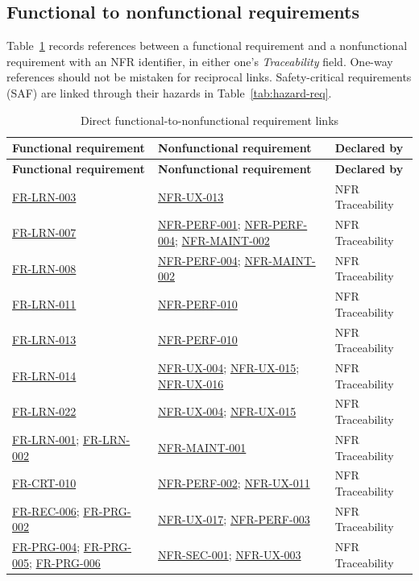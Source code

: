 \documentclass[12pt]{article}
\renewcommand{\_}{\textunderscore\allowbreak}%
\newcommand{\reqref}[1]{\hyperref[req:#1]{#1}}
\begin{document}
\subsection{Functional to nonfunctional requirements}
\label{sec:fr-nfr}

Table~\ref{tab:fr-nfr} records references between a functional requirement and
a nonfunctional requirement with an NFR identifier, in either one's
\emph{Traceability} field. One-way references
should not be mistaken for reciprocal links. Safety-critical requirements
(SAF) are linked through their hazards in Table~\ref{tab:hazard-req}.

{\small
\begin{longtable}{@{}>{\raggedright\arraybackslash}p{}
>{\raggedright\arraybackslash}p{}
>{\raggedright\arraybackslash}p{}@{}}
\caption{Direct functional-to-nonfunctional requirement links}
\label{tab:fr-nfr}\\
\toprule
\textbf{Functional requirement} & \textbf{Nonfunctional requirement} &
\textbf{Declared by} \\
\midrule
\endfirsthead
\toprule
\textbf{Functional requirement} & \textbf{Nonfunctional requirement} &
\textbf{Declared by} \\
\midrule
\endhead
\bottomrule
\endlastfoot
\reqref{FR-LRN-003} & \reqref{NFR-UX-013} & NFR Traceability \\
\addlinespace
\reqref{FR-LRN-007} & \reqref{NFR-PERF-001}; \reqref{NFR-PERF-004};
\reqref{NFR-MAINT-002} & NFR Traceability \\
\addlinespace
\reqref{FR-LRN-008} & \reqref{NFR-PERF-004}; \reqref{NFR-MAINT-002} & NFR
Traceability \\
\addlinespace
\reqref{FR-LRN-011} & \reqref{NFR-PERF-010} & NFR Traceability \\
\addlinespace
\reqref{FR-LRN-013} & \reqref{NFR-PERF-010} & NFR Traceability \\
\addlinespace
\reqref{FR-LRN-014} & \reqref{NFR-UX-004}; \reqref{NFR-UX-015};
\reqref{NFR-UX-016} & NFR Traceability \\
\addlinespace
\reqref{FR-LRN-022} & \reqref{NFR-UX-004}; \reqref{NFR-UX-015} & NFR
Traceability \\
\addlinespace
\reqref{FR-LRN-001}; \reqref{FR-LRN-002} & \reqref{NFR-MAINT-001} & NFR
Traceability \\
\addlinespace
\reqref{FR-CRT-010} & \reqref{NFR-PERF-002}; \reqref{NFR-UX-011} & NFR
Traceability \\
\addlinespace
\reqref{FR-REC-006}; \reqref{FR-PRG-002} & \reqref{NFR-UX-017};
\reqref{NFR-PERF-003} & NFR Traceability \\
\addlinespace
\reqref{FR-PRG-004}; \reqref{FR-PRG-005}; \reqref{FR-PRG-006} &
\reqref{NFR-SEC-001}; \reqref{NFR-UX-003} & NFR Traceability \\
\end{longtable}}
\end{document}
